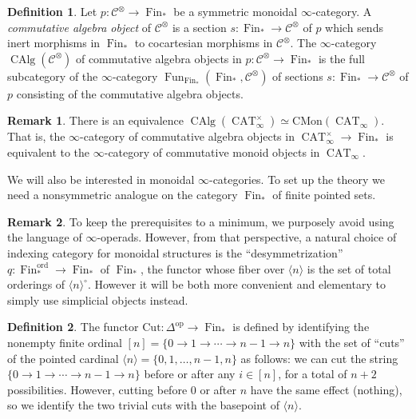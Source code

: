 \documentclass[12pt]{article}
\theoremstyle{definition}
\newtheorem{definition}{Definition}[subsection]
\newtheorem{remark}{Remark}[subsection]
\newcommand{\C}{\mathcal{C}}
\renewcommand{\i}{\infty}
\newcommand{\op}{\mathrm{op}}
\newcommand{\n}{\langle n\rangle}
\DeclareMathOperator{\CAlg}{CAlg}
\DeclareMathOperator{\CAT}{CAT}
\DeclareMathOperator{\Fin}{Fin}
\DeclareMathOperator{\Fun}{Fun}
\newcommand{\CMon}{\mathrm{CMon}}
\begin{document}
\begin{definition}
Let $p:\C^\otimes\to\Fin_*$ be a symmetric monoidal $\infty$-category.
A {\em commutative algebra object}
of $\C^\otimes$ is a section $s:\Fin_*\to\C^\otimes$ of $p$ which sends inert morphisms in $\Fin_*$ to cocartesian morphisms in $\C^\otimes$.
The $\infty$-category $\CAlg(\C^\otimes)$ of commutative algebra objects in $p:\C^\otimes\to\Fin_*$ is the full subcategory of the $\infty$-category $\Fun_{\Fin_*}(\Fin_*,\C^\otimes)$ of sections $s:\Fin_*\to\C^\otimes$ of $p$ consisting of the commutative algebra objects.
\end{definition}

\begin{remark}
There is an equivalence $\CAlg(\CAT_\i^\times)\simeq\CMon(\CAT_\i)$.
That is, the $\i$-category of commutative algebra objects in $\CAT_\i^\times\to\Fin_*$ is equivalent to the $\i$-category of commutative monoid objects in $\CAT_\i$.
\end{remark}

We will also be interested in monoidal $\infty$-categories.
To set up the theory we need a nonsymmetric analogue on the category $\Fin_*$ of finite pointed sets.
\begin{remark}
To keep the prerequisites to a minimum, we purposely avoid using the language of $\i$-operads.
However, from that perspective, a natural choice of indexing category for monoidal structures is the ``desymmetrization'' $q:\Fin_*^\mathrm{ord}\to\Fin_*$ of $\Fin_*$, the functor whose fiber over $\n$ is the set of total orderings of $\n^\circ$.
However it will be both more convenient and elementary to simply use simplicial objects instead.
\end{remark}
\begin{definition}
The functor $\mathrm{Cut}:\Delta^{\op}\to\Fin_*$ is defined by identifying the nonempty finite ordinal $[n]=\{0\to 1\to\cdots\to n-1\to n\}$ with the set of ``cuts'' of the pointed cardinal $\n=\{0,1,\ldots,n-1,n\}$ as follows: we can cut the string $\{0\to 1\to\cdots\to n-1\to n\}$ before or after any $i\in [n]$, for a total of $n+2$ possibilities.
However, cutting before $0$ or after $n$ have the same effect (nothing), so we identify the two trivial cuts with the basepoint of $\n$.
\end{definition}
\end{document}
